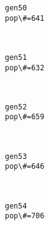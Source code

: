 \documentclass[11pt]{article}
\begin{document}
    \begin{Verbatim}[commandchars=\\\{\}]
gen50
pop\#=641

    \end{Verbatim}

    \begin{center}
    \end{center}
    { \hspace*{\fill} \\}
    
    \begin{Verbatim}[commandchars=\\\{\}]
gen51
pop\#=632

    \end{Verbatim}

    \begin{center}
    \end{center}
    { \hspace*{\fill} \\}
    
    \begin{Verbatim}[commandchars=\\\{\}]
gen52
pop\#=659

    \end{Verbatim}

    \begin{center}
    \end{center}
    { \hspace*{\fill} \\}
    
    \begin{Verbatim}[commandchars=\\\{\}]
gen53
pop\#=646

    \end{Verbatim}

    \begin{center}
    \end{center}
    { \hspace*{\fill} \\}
    
    \begin{Verbatim}[commandchars=\\\{\}]
gen54
pop\#=706

    \end{Verbatim}
\end{document}
